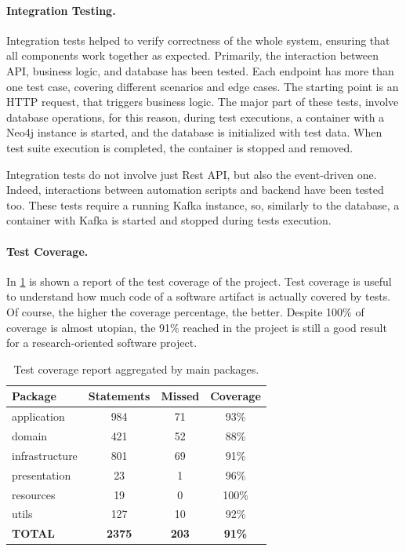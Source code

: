 \documentclass[12pt,a4paper,openright,twoside]{book}
\begin{document}
\paragraph{Integration Testing.}

Integration tests helped to verify correctness of the whole system, ensuring that all components work together as expected.
%
Primarily, the interaction between API, business logic, and database has been tested.
%
Each endpoint has more than one test case, covering different scenarios and edge cases.
%
The starting point is an HTTP request, that triggers business logic.
%
The major part of these tests, involve database operations, for this reason, during test executions, a container with a Neo4j instance is started, and the database is initialized with test data.
%
When test suite execution is completed, the container is stopped and removed.

Integration tests do not involve just Rest API, but also the event-driven one.
%
Indeed, interactions between automation scripts and backend have been tested too.
%
These tests require a running Kafka instance, so, similarly to the database, a container with Kafka is started and stopped during tests execution.


\paragraph{Test Coverage.}

In \cref{tab:coverage} is shown a report of the test coverage of the project.
%
Test coverage is useful to understand how much code of a software artifact is actually covered by tests.
%
Of course, the higher the coverage percentage, the better.
%
Despite 100\% of coverage is almost utopian, the 91\% reached in the project is still a good result for a research-oriented software project.

\begin{table}
    \centering
    \begin{tabular}{lccc}
        \toprule
        \textbf{Package} & \textbf{Statements} & \textbf{Missed} & \textbf{Coverage} \\
        \midrule
        application   & 984  & 71  & 93\% \\
        domain        & 421  & 52  & 88\% \\
        infrastructure & 801  & 69  & 91\% \\
        presentation  & 23  & 1   & 96\% \\
        resources    & 19  & 0   & 100\% \\
        utils        & 127 & 10 &  92\% \\ 
        \midrule
        \textbf{TOTAL} & \textbf{2375} & \textbf{203} & \textbf{91\%} \\
        \bottomrule
    \end{tabular}
    \caption{Test coverage report aggregated by main packages.}
    \label{tab:coverage}
\end{table}
\end{document}
